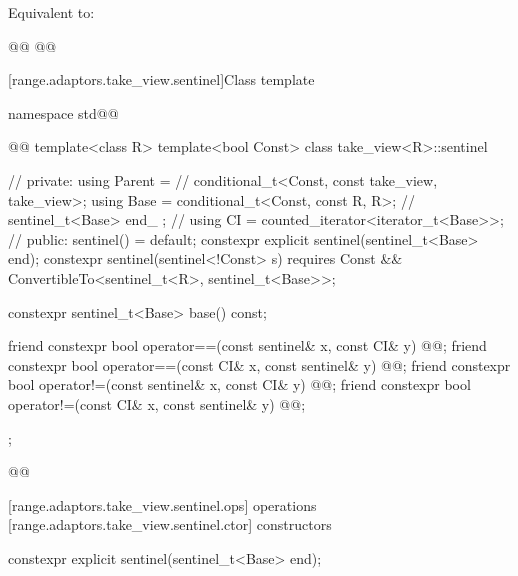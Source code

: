 {\begin{itemdescr}
\pnum
\effects Equivalent to:
\begin{codeblock}
@@
@@
\end{codeblock}
\end{itemdescr}

[range.adaptors.take_view.sentinel]{Class template }

\pnum
{}

\begin{codeblock}
namespace std@@ { @@
  template<class R>
  template<bool Const>
  class take_view<R>::sentinel { // \expos
  private:
    using Parent =                                 // \expos
      conditional_t<Const, const take_view, take_view>;
    using Base = conditional_t<Const, const R, R>; // \expos
    sentinel_t<Base> end_ {};                      // \expos
    using CI = counted_iterator<iterator_t<Base>>; // \expos
  public:
    sentinel() = default;
    constexpr explicit sentinel(sentinel_t<Base> end);
    constexpr sentinel(sentinel<!Const> s)
      requires Const && ConvertibleTo<sentinel_t<R>, sentinel_t<Base>>;

    constexpr sentinel_t<Base> base() const;

    friend constexpr bool operator==(const sentinel& x, const CI& y)
      @@;
    friend constexpr bool operator==(const CI& x, const sentinel& y)
      @@;
    friend constexpr bool operator!=(const sentinel& x, const CI& y)
      @@;
    friend constexpr bool operator!=(const CI& x, const sentinel& y)
      @@;
  };
}@\oldtxt{\}}@
\end{codeblock}

[range.adaptors.take_view.sentinel.ops]{ operations}
[range.adaptors.take_view.sentinel.ctor]{ constructors}

\begin{itemdecl}
constexpr explicit sentinel(sentinel_t<Base> end);
\end{itemdecl}

}
